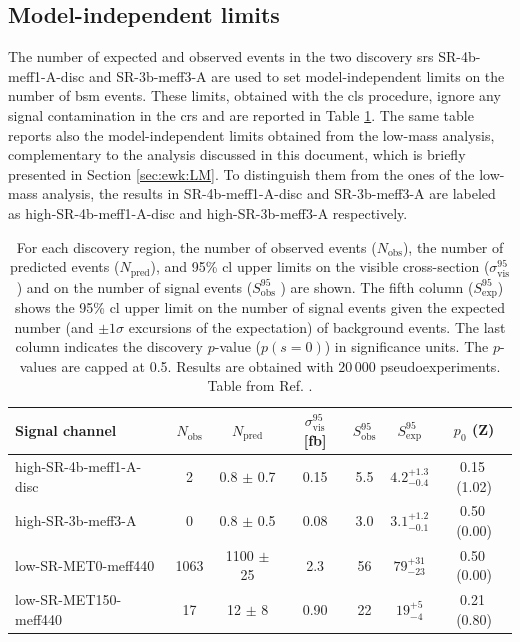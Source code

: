 \subsection{Model-independent limits}
\label{sec:ewk:modelindepUL}

The number of expected and observed events in the two discovery \glspl{sr} SR-4b-meff1-A-disc and SR-3b-meff3-A are used to set model-independent limits on the number of \gls{bsm} events. 
These limits, obtained with the \gls{cls} procedure, ignore any signal contamination in the \glspl{cr} and are reported in Table \ref{tab:ewk:UL_toys}.
The same table reports also the model-independent limits obtained from the low-mass analysis, complementary to the analysis 
discussed in this document, which is briefly presented in Section \ref{sec:ewk:LM}. 
To distinguish them from the ones of the low-mass analysis, the results in SR-4b-meff1-A-disc and SR-3b-meff3-A are labeled as 
high-SR-4b-meff1-A-disc and high-SR-3b-meff3-A respectively. 

\begin{table}[htbp]
\begin{center}
\begin{tabular}{|l|c|c|c|c|c|c|}
\toprule
{ Signal channel}           &   $N_\mathrm{obs}$ & $N_\mathrm{pred}$       & $\sigma^\mathrm{95}_\mathrm{vis}$ [fb] &  $S_\mathrm{obs}^\mathrm{95}$  & $S_\mathrm{exp}^\mathrm{95}$ & $p_0$ (Z)  \\
\midrule
high-SR-4b-meff1-A-disc   &    2 &     0.8 $\pm$ 0.7  & 0.15 &   5.5 & ${ 4.2 }^{ +1.3 }_{ -0.4 }$  &  0.15$~$(1.02) \\%
high-SR-3b-meff3-A        &    0 &     0.8 $\pm$ 0.5  & 0.08 &   3.0 & ${ 3.1 }^{ +1.2 }_{ -0.1 }$  &  0.50$~$(0.00) \\%
low-SR-MET0-meff440       & 1063 &    1100 $\pm$ 25   & 2.3  &  56   & ${ 79 }^{ +31 }_{ -23 }$     &  0.50$~$(0.00) \\%
low-SR-MET150-meff440     &   17 &      12 $\pm$ 8    & 0.90 &  22   & ${ 19 }^{ +5 }_{ -4 }$       &  0.21$~$(0.80) \\%
\bottomrule
\end{tabular}
\end{center}
\caption[Model independent upper limits]{For each discovery region, the number of observed events ($N_\mathrm{obs}$), the number of predicted events ($N_\mathrm{pred}$), and 95\% \gls{cl} upper limits on the visible cross-section ($\sigma^\mathrm{95}_\mathrm{vis}$) and on the number of signal events ($S_\mathrm{obs}^\mathrm{95}$ ) are shown.  The fifth column ($S_\mathrm{exp}^\mathrm{95}$) shows the 95\% \gls{cl} upper limit on the number of signal events given the expected number (and $\pm 1\sigma$ excursions of the expectation) of background events. The last column indicates the discovery $p$-value ($p(s=0)$) in significance units. The $p$-values are capped at 0.5. Results are obtained with $20\,000$ pseudoexperiments.
Table from Ref. \cite{Aaboud:2018htj}.
}
\label{tab:ewk:UL_toys}
\end{table}

